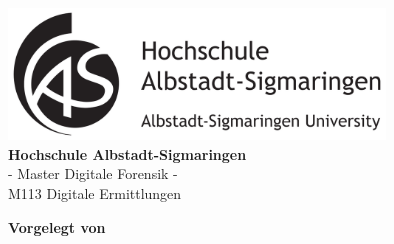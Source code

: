 \begin{titlepage}
	\begin{center}
		\includegraphics[width=10cm]{images/albsig.png}\vspace{3ex}\\
		{\LARGE \textbf{Hochschule Albstadt-Sigmaringen}}\vspace{1.3ex}\\
		{\LARGE - Master Digitale Forensik -} \\
        {\LARGE M113 Digitale Ermittlungen}
		\vfill
		{\LARGE\bfseries 
			\docTitle
		
		}\vspace{3ex}
		
		{\Large 
			\subTitle
		}
	\vspace{5ex}
		
	\vspace{5ex}
		
		
		{ \bf Vorgelegt von}\vspace{0.1ex}\\
		\student\vspace{9ex}\\
		\vspace{0.1ex}
		\makebox[5cm][l]{\prof} \vspace{1ex}\\
		\vspace{0.1ex}
		\makebox[5cm][l]{\coprof} \vspace{0.1ex}\\
	\end{center}
\end{titlepage}